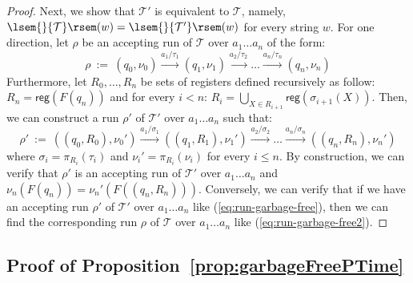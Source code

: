 \documentclass[
a4paper
]{article}
\theoremstyle{plain}
\theoremstyle{definition}
\theoremstyle{remark}
\newcommand{\nsst}{\mathcal{T}}
\newcommand{\reg}{\operatorname{reg}}
\newcommand{\sem}[1]{{\lsem{}{#1}\rsem}}
\renewcommand{\operatorname}[1]{\textsf{#1}}
\begin{document}
\begin{proof}
	Next, we show that $\nsst'$ is equivalent to $\nsst$, namely, $\sem{\nsst}(w) = \sem{\nsst'}(w)$ for every string $w$. For one direction, let $\rho$ be an accepting run of $\nsst$ over $a_1\ldots a_n$ of the form:
	\begin{equation} \label{eq:run-garbage-free}
		\rho \ := \ (q_0, \nu_0) \xrightarrow{a_1/\tau_1} (q_1, \nu_1) \xrightarrow{a_2 /\tau_2} \ldots \xrightarrow{a_n/\tau_{n}} (q_{n}, \nu_n) \tag{\dag}
	\end{equation}
	Furthermore, let $R_0, \ldots, R_n$ be sets of registers defined recursively as follow: 
	$R_n = \reg(F(q_n))$ and for every $i < n$:
	$ 
	R_i = \bigcup_{X \in R_{i+1}} \reg(\sigma_{i+1}(X)).
	$
	Then, we can construct a run $\rho'$ of $\nsst'$ over $a_1 \ldots a_n$ such that: 
	\begin{equation*}  \label{eq:run-garbage-free2}
		\rho' \ := \ ((q_0, R_0), \nu_0') \xrightarrow{a_1/\sigma_1} ((q_1, R_1), \nu_1') \xrightarrow{a_2 /\sigma_2} \ldots \xrightarrow{a_n/\sigma_{n}} ((q_{n},R_n), \nu_n') \tag{\ddag}
	\end{equation*}
	where $\sigma_i = \pi_{R_i}(\tau_i)$ and $\nu_i' = \pi_{R_i}(\nu_i)$ for every $i \leq n$. By construction, we can verify that $\rho'$ is an accepting run of $\nsst'$ over $a_1\ldots a_n$ and $\nu_n(F(q_n)) = \nu_n'(F((q_n, R_n)))$. Conversely, we can verify that if we have an accepting run $\rho'$ of $\nsst'$ over $a_1\ldots a_n$ like (\ref{eq:run-garbage-free}), then we can find the corresponding run $\rho$ of $\nsst$ over $a_1 \ldots a_n$ like (\ref{eq:run-garbage-free2}). 
\end{proof}

\subsection{Proof of Proposition~\ref{prop:garbageFreePTime}}
\end{document}
